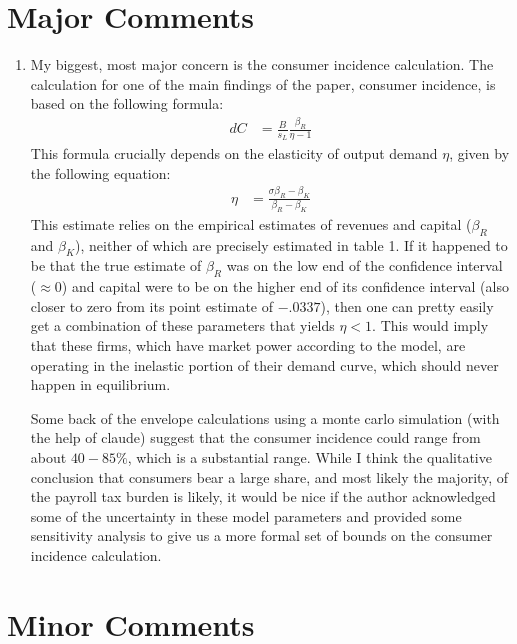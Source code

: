\documentclass{article}
\begin{document}
\section*{Major Comments}

\begin{enumerate}
    \item My biggest, most major concern is the consumer incidence calculation. The calculation for one of the main findings of the paper, consumer incidence, is based on the following formula: 
    \[
    \begin{aligned}
    dC &= \frac{B}{s_L} \frac{\beta_R}{\eta - 1}
    \end{aligned}
    \]
    This formula crucially depends on the elasticity of output demand $\eta$, given by the following equation: 
    \[
    \begin{aligned}
    \eta &= \frac{\sigma \beta_R - \beta_K}{\beta_R - \beta_K}
    \end{aligned}
    \]
    This estimate relies on the empirical estimates of revenues and capital ($\beta_R$ and $\beta_K$), neither of which are precisely estimated in table 1. 
    If it happened to be that the true estimate of $\beta_R$ was on the low end of the confidence interval ($\approx 0$) and 
    capital were to be on the higher end of its confidence interval (also closer to zero from its point estimate of $-.0337$), then one can pretty easily get a combination of these 
    parameters that yields $\eta < 1$. This would imply that these firms, which have market power according to the model, are operating in the inelastic portion of their demand curve, which should never happen in equilibrium.

    Some back of the envelope calculations using a monte carlo simulation (with the help of claude) suggest that the consumer incidence could range from about $40-85\%$, which is a substantial range. 
    While I think the qualitative conclusion that consumers bear a large share, and most likely the majority, of the payroll tax burden is likely, it would be nice if the author acknowledged some of the uncertainty in these model parameters and 
    provided some sensitivity analysis to give us a more formal set of bounds on the consumer incidence calculation.
 
\end{enumerate}

\section*{Minor Comments}
\end{document}
